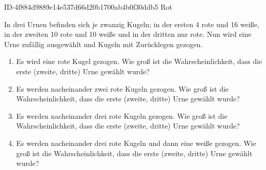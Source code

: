 \begin{exercise}
      {ID-4f884d9889e14e537d66d20b1700ab4b0f30ddb5}
      {Rot}
  \ifproblem\problem\par
    In drei Urnen befinden sich je zwanzig Kugeln; in der ersten 4 rote und
    16 weiße, in der zweiten 10 rote und 10 weiße und in der dritten nur rote.
    Nun wird eine Urne zufällig ausgewählt und Kugeln mit Zurücklegen gezogen.
    \begin{enumerate}
      \item Es wird eine rote Kugel gezogen. Wie groß ist die Wahrscheinlichkeit,
            dass die erste (zweite, dritte) Urne gewählt wurde?
      \item Es werden nacheinander zwei rote Kugeln gezogen. Wie groß ist die
            Wahrscheinlichkeit, dass die erste (zweite, dritte) Urne gewählt wurde?
      \item Es werden nacheinander drei rote Kugeln gezogen. Wie groß ist die
            Wahrscheinlichkeit, dass die erste (zweite, dritte) Urne gewählt wurde?
      \item Es werden nacheinander drei rote Kugeln und dann eine weiße gezogen.
            Wie groß ist die Wahrscheinlichkeit, dass die erste (zweite, dritte)
            Urne gewählt wurde?
    \end{enumerate}
  \fi
\end{exercise}
